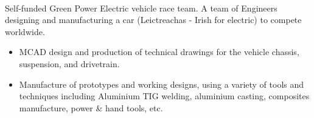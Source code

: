 \documentclass[10pt,a4paper,withhyper]{altacv}
\begin{document}
\begin{paracol}{2}







\bigskip
\bigskip








\switchcolumn


 \\
\vspace{1mm}
Self-funded Green Power Electric vehicle race team. A team of Engineers designing and manufacturing a car (Leictreachas - Irish for electric) to compete worldwide.
\begin{itemize}
\item MCAD design and production of technical drawings for the vehicle chassis, suspension, and drivetrain.
\item Manufacture of prototypes and working designs, using a variety of tools and techniques including Aluminium TIG welding, aluminium casting, composites manufacture, power \& hand tools, etc.
\end{itemize}


\end{paracol}
\end{document}
